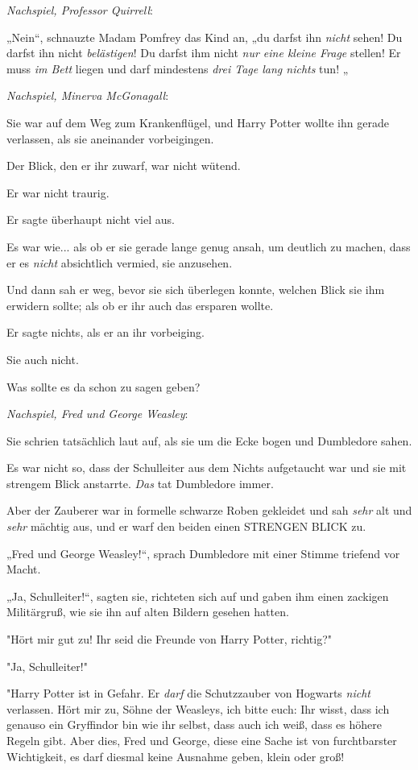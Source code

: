 {\emph{Nachspiel, Professor Quirrell}:

„Nein“, schnauzte Madam Pomfrey das Kind an, „du darfst ihn \emph{nicht} sehen! Du darfst ihn nicht \emph{belästigen}! Du darfst ihm nicht \emph{nur eine kleine Frage} stellen! Er muss \emph{im Bett} liegen und darf mindestens \emph{drei Tage lang nichts} tun! „

\emph{Nachspiel, Minerva McGonagall}:

Sie war auf dem Weg zum Krankenflügel, und Harry Potter wollte ihn gerade verlassen, als sie aneinander vorbeigingen.

Der Blick, den er ihr zuwarf, war nicht wütend.

Er war nicht traurig.

Er sagte überhaupt nicht viel aus.

Es war wie... als ob er sie gerade lange genug ansah, um deutlich zu machen, dass er es \emph{nicht} absichtlich vermied, sie anzusehen.

Und dann sah er weg, bevor sie sich überlegen konnte, welchen Blick sie ihm erwidern sollte; als ob er ihr auch das ersparen wollte.

Er sagte nichts, als er an ihr vorbeiging.

Sie auch nicht.

Was sollte es da schon zu sagen geben?

\emph{Nachspiel, Fred und George Weasley}:

Sie schrien tatsächlich laut auf, als sie um die Ecke bogen und Dumbledore sahen.

Es war nicht so, dass der Schulleiter aus dem Nichts aufgetaucht war und sie mit strengem Blick anstarrte. \emph{Das} tat Dumbledore immer.

Aber der Zauberer war in formelle schwarze Roben gekleidet und sah \emph{sehr} alt und \emph{sehr} mächtig aus, und er warf den beiden einen STRENGEN BLICK zu.

„Fred und George Weasley!“, sprach Dumbledore mit einer Stimme triefend vor Macht.

„Ja, Schulleiter!“, sagten sie, richteten sich auf und gaben ihm einen zackigen Militärgruß, wie sie ihn auf alten Bildern gesehen hatten.

"Hört mir gut zu! Ihr seid die Freunde von Harry Potter, richtig?"

"Ja, Schulleiter!"

"Harry Potter ist in Gefahr. Er \emph{darf} die Schutzzauber von Hogwarts \emph{nicht} verlassen. Hört mir zu, Söhne der Weasleys, ich bitte euch: Ihr wisst, dass ich genauso ein Gryffindor bin wie ihr selbst, dass auch ich weiß, dass es höhere Regeln gibt. Aber dies, Fred und George, diese eine Sache ist von furchtbarster Wichtigkeit, es darf diesmal keine Ausnahme geben, klein oder groß!

}
